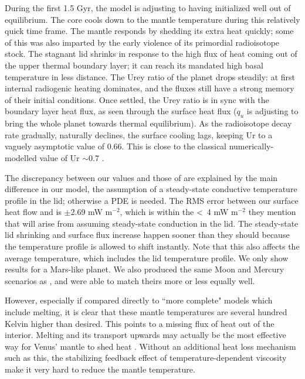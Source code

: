 During the first 1.5 Gyr, the model is adjusting to having initialized well out of equilibrium. The core cools down to the mantle temperature during this relatively quick time frame. The mantle responds by shedding its extra heat quickly; some of this was also imparted by the early violence of its primordial radioisotope stock. The stagnant lid shrinks in response to the high flux of heat coming out of the upper thermal boundary layer; it can reach its mandated high basal temperature in less distance. The Urey ratio of the planet drops steadily: at first internal radiogenic heating dominates, and the fluxes still have a strong memory of their initial conditions. Once settled, the Urey ratio is in sync with the boundary layer heat flux, as seen through the surface heat flux ($q_{u}$ is adjusting to bring the whole planet towards thermal equilibrium). As the radioisotope decay rate gradually, naturally declines, the surface cooling lags, keeping Ur to a vaguely asymptotic value of 0.66. This is close to the classical numerically-modelled value of Ur $\sim$0.7 \citep{Schubert1980, McKenzie1981}.

The discrepancy between our values and those of \citet{Thiriet2019} are explained by the main difference in our model, the assumption of a steady-state conductive temperature profile in the lid; otherwise a PDE is needed. The RMS error between our surface heat flow and \citet{Thiriet2019} is $\pm$2.69 mW m$^{-2}$, which is within the \textless~4 mW m$^{-2}$ they mention that will arise from assuming steady-state conduction in the lid. The steady-state lid shrinking and surface flux increase happen sooner than they should because the temperature profile is allowed to shift instantly. Note that this also affects the average temperature, which includes the lid temperature profile. We only show results for a Mars-like planet. We also produced the same Moon and Mercury scenarios as \citet{Thiriet2019}, and were able to match theirs more or less equally well.  

However, especially if compared directly to ``more complete" models which include melting, it is clear that these mantle temperatures are several hundred Kelvin higher than desired. This points to a missing flux of heat out of the interior. Melting and its transport upwards may actually be the most effective way for Venus' mantle to shed heat \citep{Armann2012}. Without an additional heat loss mechanism such as this, the stabilizing feedback effect of temperature-dependent viscosity make it very hard to reduce the mantle temperature. 

